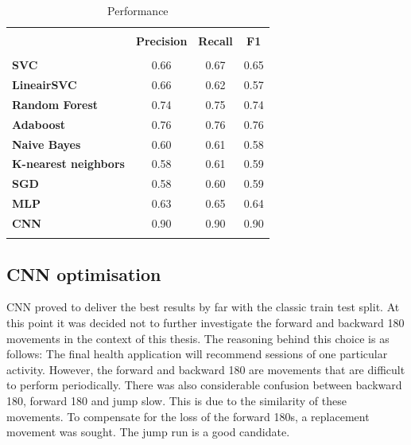 \documentclass[twocolumn]{phdsymp} %
\begin{document}
\begin{table}[!htpd]
  \centering
  \caption{Performance}
  \label{tab:CNN}
\begin{tabular}{lccc}
 \hline \\
\textbf{}             & \textbf{Precision} & \textbf{Recall} & \textbf{F1} &  \\
\hline \\
\textbf{SVC}                 & 0.66               & 0.67            & 0.65        &  \\
\textbf{LineairSVC}         & 0.66               & 0.62            & 0.57        &  \\
\textbf{Random Forest}       & 0.74               & 0.75            & 0.74        &  \\
\textbf{Adaboost}           & 0.76               & 0.76            & 0.76        &  \\
\textbf{Naive Bayes}         & 0.60               & 0.61               & 0.58        &  \\
\textbf{K-nearest neighbors}   & 0.58                  & 0.61            & 0.59        & \\
\textbf{SGD}                    & 0.58                  & 0.60            & 0.59        & \\
\textbf{MLP}                    & 0.63                  & 0.65            & 0.64       & \\
\textbf{CNN}                     & 0.90                  & 0.90            & 0.90        & \\
\hline \\
\end{tabular}
\end{table}

\subsection{CNN optimisation} \label{section:cnn}
CNN proved to deliver the best results by far with the classic train test split. 
At this point it was decided not to further investigate the forward and backward 180 movements in the context of this thesis.
The reasoning behind this choice is as follows: The final health application will recommend sessions of one particular activity. However, the forward and backward 180 are movements that are difficult to perform periodically. There was also considerable confusion between backward 180, forward 180 and jump slow. This is due to the similarity of these movements.
To compensate for the loss of the forward 180s, a replacement movement was sought. The jump run is a good candidate. \\
\end{document}
